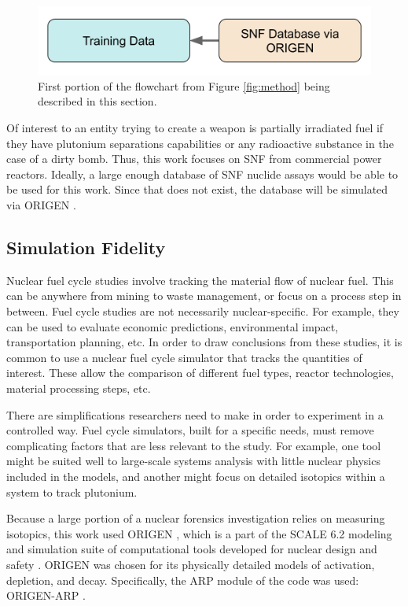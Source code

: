 \begin{figure}[H]
  \centering
  \includegraphics[width=0.7\linewidth]{./chapters/exp1/methodology1.png}
  \caption{First portion of the flowchart from Figure \ref{fig:method} being 
           described in this section.}
\end{figure}

Of interest to an entity trying to create a weapon is partially irradiated fuel
if they have plutonium separations capabilities or any radioactive substance in
the case of a dirty bomb. Thus, this work focuses on \gls{SNF} from commercial
power reactors. Ideally, a large enough database of \gls{SNF} nuclide assays
would be able to be used for this work. Since that does not exist, the 
database will be simulated via \gls{ORIGEN} \cite{origen, origenarp}.  

\subsection{Simulation Fidelity}
\label{sec:fidelity}

Nuclear fuel cycle studies involve tracking the material flow of nuclear fuel.
This can be anywhere from mining to waste management, or focus on a process
step in between. Fuel cycle studies are not necessarily nuclear-specific. For
example, they can be used to evaluate economic predictions, environmental
impact, transportation planning, etc.  In order to draw conclusions from these
studies, it is common to use a nuclear fuel cycle simulator that tracks the
quantities of interest. These allow the comparison of different fuel types,
reactor technologies, material processing steps, etc. 

There are simplifications researchers need to make in order to experiment in a
controlled way. Fuel cycle simulators, built for a specific needs, must remove
complicating factors that are less relevant to the study.  For example, one
tool might be suited well to large-scale systems analysis with little nuclear
physics included in the models, and another might focus on detailed isotopics
within a system to track plutonium.

Because a large portion of a nuclear forensics investigation relies on
measuring isotopics, this work used \gls{ORIGEN} \cite{origen}, which is a part
of the \gls{SCALE} 6.2 modeling and simulation suite of computational tools
developed for nuclear design and safety \cite{scale}. \gls{ORIGEN} was chosen
for its physically detailed models of activation, depletion, and decay.
Specifically, the ARP module of the code was used: \gls{ORIGEN-ARP}
\cite{origenarp}.

